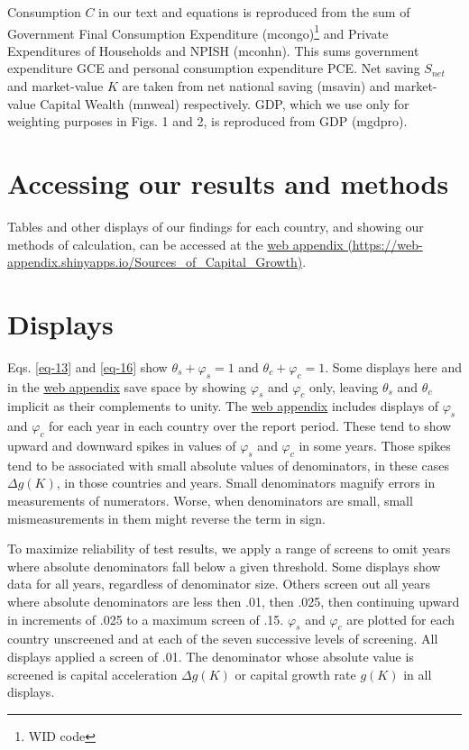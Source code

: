 \documentclass[a4paper,fleqn]{latex_styles/cas-sc}
\begin{document}
Consumption $C$ in our text and equations is reproduced from the sum of Government Final Consumption Expenditure (mcongo)\footnote{\label{widnote}WID code} and Private Expenditures of Households and NPISH (mconhn). This sums government expenditure GCE and personal consumption expenditure PCE. Net saving $S_{net}$ and market-value $K$ are taken from net national saving (msavin) and market-value Capital Wealth (mnweal) respectively. GDP, which we use only for weighting purposes in Figs. 1 and 2, is reproduced from GDP (mgdpro).

\hypertarget{accessing-our-results-and-methods}{%
\section{Accessing our results and
methods}\label{accessing-our-results-and-methods}}

Tables and other displays of our findings for each country, and showing
our methods of calculation, can be accessed at the
\href{https://web-appendix.shinyapps.io/Sources\_of\_Capital\_Growth/}{web appendix (https://web-appendix.shinyapps.io/Sources\_of\_Capital\_Growth)}.

\hypertarget{sec-displays}{%
\section{Displays}\label{sec-displays}}

Eqs. \eqref{eq-13} and \eqref{eq-16} show
\(\theta_s + \varphi_s = 1\) and \(\theta_c + \varphi_c = 1\). Some
displays here and in the
\href{https://web-appendix.shinyapps.io/Sources\_of\_Capital\_Growth/}{web appendix}
save space by showing \(\varphi_s\) and \(\varphi_c\) only, leaving
\(\theta_s\) and \(\theta_c\) implicit as their complements to unity.
The \href{https://web-appendix.shinyapps.io/Sources\_of\_Capital\_Growth/}{web
appendix} includes displays of \(\varphi_s\) and \(\varphi_c\) for
each year in each country over the report period. These tend to show
upward and downward spikes in values of \(\varphi_s\) and \(\varphi_c\)
in some years. Those spikes tend to be associated with small absolute
values of denominators, in these cases \(\Delta g(K)\), in those
countries and years. Small denominators magnify errors in measurements
of numerators. Worse, when denominators are small, small mismeasurements in them might reverse the term in sign.

To maximize reliability of test results, we apply a range of screens to
omit years where absolute denominators fall below a given
threshold. Some displays show data for all years, regardless of denominator size.
Others screen out all years where
absolute denominators are less then .01, then .025, then continuing upward in
increments of .025 to a maximum screen of .15. \(\varphi_s\) and
\(\varphi_c\) are plotted for each country unscreened and at each of the
seven successive levels of screening. All displays applied a screen of .01. 
The denominator whose absolute value is screened is capital acceleration
$\Delta g(K)$ or capital growth rate \(g(K)\) in all displays. 
\end{document}
